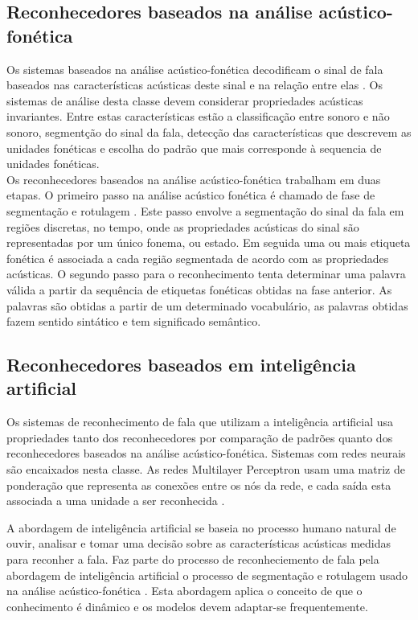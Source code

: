 \subsection{Reconhecedores baseados na análise acústico-fonética}

Os sistemas baseados na análise acústico-fonética decodificam o sinal de fala  baseados nas características acústicas deste sinal e na relação entre elas \cite{kluwer}. Os sistemas de análise desta classe devem considerar propriedades acústicas invariantes. Entre estas características estão a classificação entre sonoro e não sonoro, segmentção do sinal da fala, detecção das características que descrevem as unidades fonéticas e escolha do padrão que mais corresponde à sequencia de unidades fonéticas.\\

Os reconhecedores baseados na análise acústico-fonética trabalham em duas etapas. O primeiro passo na análise acústico fonética é chamado de fase de segmentação e rotulagem \cite{fundRecFala}. Este passo envolve a segmentação do sinal da fala em regiões discretas, no tempo, onde as propriedades acústicas do sinal são representadas por um único fonema, ou estado. Em seguida uma ou mais etiqueta fonética é associada a cada região segmentada de acordo com as propriedades acústicas. O segundo passo para o reconhecimento tenta determinar uma palavra válida a partir da sequência de etiquetas fonéticas obtidas na fase anterior. As palavras são obtidas a partir de um determinado vocabulário, as palavras obtidas fazem sentido sintático e tem significado semântico.

\subsection{Reconhecedores baseados em inteligência artificial}

Os sistemas de reconhecimento de fala que utilizam a inteligência artificial usa propriedades tanto dos reconhecedores por comparação de padrões quanto dos reconhecedores baseados na análise acústico-fonética. Sistemas com redes neurais são encaixados nesta classe. As redes Multilayer Perceptron usam uma matriz de ponderação que representa as conexões entre os nós da rede, e cada saída esta associada a uma unidade a ser reconhecida \cite{kluwerNeural}.

A abordagem de inteligência artificial se baseia no processo humano natural de ouvir, analisar e tomar uma decisão sobre as características acústicas medidas para reconher a fala. Faz parte do processo de reconheciemento de fala pela abordagem de inteligência artificial o processo de segmentação e rotulagem usado na análise acústico-fonética  \cite{fundRecFala}. Esta abordagem aplica o conceito de que o conhecimento é dinâmico  e os modelos devem adaptar-se frequentemente. 




